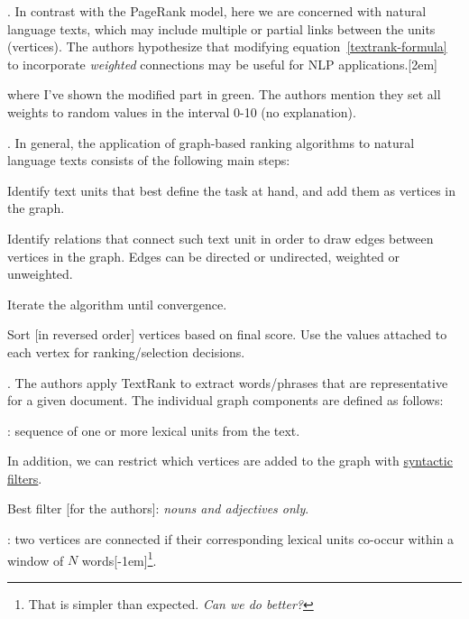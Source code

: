 \documentclass[11pt]{article}
\begin{document}
\myspace 
\p {}. In contrast with the PageRank model, here we are concerned with natural language texts, which may include multiple or partial links between the units (vertices). The authors hypothesize that modifying equation~\ref{textrank-formula} to incorporate \textit{weighted} connections may be useful for NLP applications.[2em]

where I've shown the modified part in green. The authors mention they set all weights to random values in the interval 0-10 (no explanation). 

\myspace
\p {}. In general, the application of graph-based ranking algorithms to natural language texts consists of the following main steps:
\begin{compactitem}
	\item[(1)] Identify text units that best define the task at hand, and add them as vertices in the graph.
	
	\item[(2)] Identify relations that connect such text unit in order to draw edges between vertices in the graph. Edges can be directed or undirected, weighted or unweighted.
	
	\item[(3)] Iterate the algorithm until convergence.\vspace{0.3em}
	
	\item[(4)] Sort [in reversed order] vertices based on final score. Use the values attached to each vertex for ranking/selection decisions.
\end{compactitem}

\myspace{}
\myspace

\p {}. The authors apply TextRank to extract words/phrases that are representative for a given document. The individual graph components are defined as follows:
\begin{compactitem}[-]
	\item {}: sequence of one or more lexical units from the text.
	\begin{compactitem}
		\item In addition, we can restrict which vertices are added to the graph with \underline{syntactic filters}.
		\item Best filter [for the authors]: \textit{nouns and adjectives only}.
	\end{compactitem}
	\item {}: two vertices are connected if their corresponding lexical units co-occur within a window of $N$ words[-1em]\footnote{That is \textellipsis  simpler than expected. \textit{Can we do better?}}.
\end{compactitem}
\end{document}
